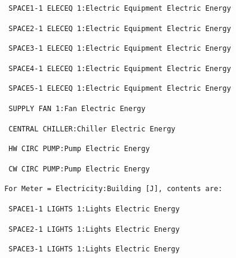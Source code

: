 \begin{lstlisting}
  SPACE1-1 ELECEQ 1:Electric Equipment Electric Energy
\end{lstlisting}

\begin{lstlisting}
  SPACE2-1 ELECEQ 1:Electric Equipment Electric Energy
\end{lstlisting}

\begin{lstlisting}
  SPACE3-1 ELECEQ 1:Electric Equipment Electric Energy
\end{lstlisting}

\begin{lstlisting}
  SPACE4-1 ELECEQ 1:Electric Equipment Electric Energy
\end{lstlisting}

\begin{lstlisting}
  SPACE5-1 ELECEQ 1:Electric Equipment Electric Energy
\end{lstlisting}

\begin{lstlisting}
  SUPPLY FAN 1:Fan Electric Energy
\end{lstlisting}

\begin{lstlisting}
  CENTRAL CHILLER:Chiller Electric Energy
\end{lstlisting}

\begin{lstlisting}
  HW CIRC PUMP:Pump Electric Energy
\end{lstlisting}

\begin{lstlisting}
  CW CIRC PUMP:Pump Electric Energy
\end{lstlisting}

\begin{lstlisting}
 For Meter = Electricity:Building [J], contents are:
\end{lstlisting}

\begin{lstlisting}
  SPACE1-1 LIGHTS 1:Lights Electric Energy
\end{lstlisting}

\begin{lstlisting}
  SPACE2-1 LIGHTS 1:Lights Electric Energy
\end{lstlisting}

\begin{lstlisting}
  SPACE3-1 LIGHTS 1:Lights Electric Energy
\end{lstlisting}

